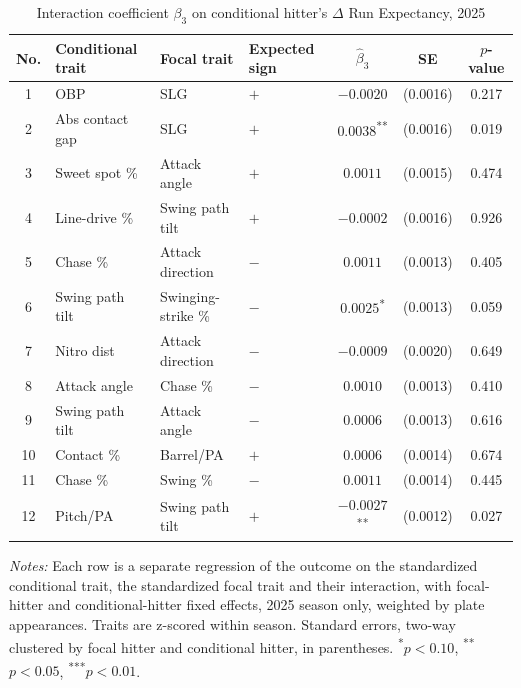 \begin{table}[htbp]
\centering
\small
\caption{Interaction coefficient $\beta_3$ on conditional hitter's $\Delta$ Run Expectancy, 2025}
\label{tab:table1_cond_2025}
\begin{tabular}{clllccc}
\toprule
No. & Conditional trait & Focal trait & Expected sign & $\hat\beta_3$ & SE & $p$-value \\
\midrule
1 & OBP & SLG & $+$ & $-0.0020$ & (0.0016) & 0.217 \\
2 & Abs contact gap & SLG & $+$ & $0.0038$\textsuperscript{**} & (0.0016) & 0.019 \\
3 & Sweet spot \% & Attack angle & $+$ & $0.0011$ & (0.0015) & 0.474 \\
4 & Line-drive \% & Swing path tilt & $+$ & $-0.0002$ & (0.0016) & 0.926 \\
5 & Chase \% & Attack direction & $-$ & $0.0011$ & (0.0013) & 0.405 \\
6 & Swing path tilt & Swinging-strike \% & $-$ & $0.0025$\textsuperscript{*} & (0.0013) & 0.059 \\
7 & Nitro dist & Attack direction & $-$ & $-0.0009$ & (0.0020) & 0.649 \\
8 & Attack angle & Chase \% & $-$ & $0.0010$ & (0.0013) & 0.410 \\
9 & Swing path tilt & Attack angle & $-$ & $0.0006$ & (0.0013) & 0.616 \\
10 & Contact \% & Barrel/PA & $+$ & $0.0006$ & (0.0014) & 0.674 \\
11 & Chase \% & Swing \% & $-$ & $0.0011$ & (0.0014) & 0.445 \\
12 & Pitch/PA & Swing path tilt & $+$ & $-0.0027$\textsuperscript{**} & (0.0012) & 0.027 \\
\bottomrule
\end{tabular}
\par\smallskip\parbox{0.95\textwidth}{\footnotesize \textit{Notes:} Each row is a separate regression of the outcome on the standardized conditional trait, the standardized focal trait and their interaction, with focal-hitter and conditional-hitter fixed effects, 2025 season only, weighted by plate appearances. Traits are z-scored within season. Standard errors, two-way clustered by focal hitter and conditional hitter, in parentheses. \textsuperscript{*}$p<0.10$, \textsuperscript{**}$p<0.05$, \textsuperscript{***}$p<0.01$.}
\end{table}
